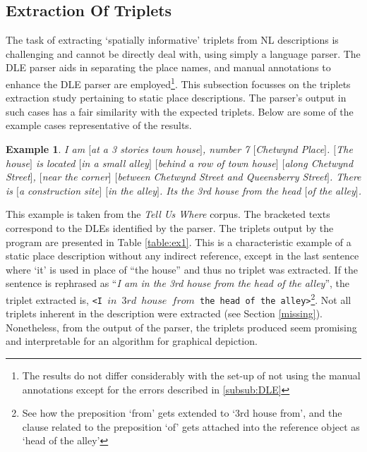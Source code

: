 \documentclass{acm_proc_article-sp}
\begin{document}
\subsection{Extraction Of Triplets}
The task of extracting `spatially informative' triplets from NL descriptions is challenging and cannot be directly deal with, using simply a language parser. The DLE parser aids in separating the place names, and manual annotations to enhance the DLE parser are employed\footnote{The results do not differ considerably with the set-up of not using the manual annotations except for the errors described in \ref{subsub:DLE}}. This subsection focusses on the triplets extraction study pertaining to static place descriptions. The parser's output in such cases has a fair similarity with the expected triplets. Below are some of the example cases representative of the results. 
\newtheorem{example}{Example}
\begin{example}
I am $[$at a 3 stories town house$]$, number 7 $[$Chetwynd Place$]$. $[$The house$]$ is located $[$in a small alley$]$ $[$behind a row of town house$]$ $[$along Chetwynd Street$]$, $[$near the corner$]$ $[$between Chetwynd Street and Queensberry Street$]$. There is $[$a construction site$]$ $[$in the alley$]$. Its the 3rd house from the head $[$of the alley$]$.
\end{example}
This example is taken from the \textit{Tell Us Where} corpus. The bracketed texts correspond to the DLEs identified by the parser. The triplets output by the program are presented in Table \ref{table:ex1}. This is a characteristic example of a static place description without any indirect reference, except in the last sentence where `it' is used in place of ``the house'' and thus no triplet was extracted. If the sentence is rephrased as ``\textit{I am in the 3rd house from the head of the alley}'', the triplet extracted is, \texttt{<I $in$ $3rd$ $house$ $from$ the head of the alley>}\footnote{See how the preposition `from' gets extended to `3rd house from', and the clause related to the preposition `of' gets attached into the reference object as `head of the alley'}. Not all triplets inherent in the description were extracted (see Section \ref{missing}). Nonetheless, from the output of the parser, the triplets produced seem promising and interpretable for an algorithm for graphical depiction. 
\end{document}
